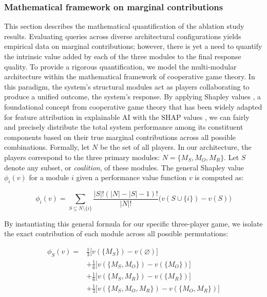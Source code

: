 \documentclass[preprint,review,12pt,authoryear]{elsarticle}
\begin{document}
\subsubsection{Mathematical framework on marginal contributions}

This section describes the mathematical quantification of the ablation study results. Evaluating queries across diverse architectural configurations yields empirical data on marginal contributions; however, there is yet a need to quantify the intrinsic value added by each of the three modules to the final response quality. To provide a rigorous quantification, we model the multi-modular architecture within the mathematical framework of cooperative game theory. In this paradigm, the system's structural modules act as players collaborating to produce a unified outcome, the system's response. By applying Shapley values \citep{shapley1953value}, a foundational concept from cooperative game theory that has been widely adapted for feature attribution in explainable AI with the SHAP values \citep{lundberg_unified_2017}, we can fairly and precisely distribute the total system performance among its constituent components based on their true marginal contributions across all possible combinations. Formally, let $N$ be the set of all players. In our architecture, the players correspond to the three primary modules: $N = \{M_{S}, M_{O}, M_{R}\}$. Let $S$ denote any subset, or \textit{coalition}, of these modules. The general Shapley value $\phi_i(v)$ for a module $i$ given a performance value function $v$ is computed as:

\begin{equation}
	\phi_i(v) = \sum_{S \subseteq N \setminus \{i\}} \frac{|S|!(|N| - |S| - 1)!}{|N|!} \big(v(S \cup \{i\}) - v(S)\big)
\end{equation}

By instantiating this general formula for our specific three-player game, we isolate the exact contribution of each module across all possible permutations:

\begin{equation}
    \begin{split}
        \phi_S(v) = {} & \frac{1}{3} \big[ v(\{M_S\}) - v(\varnothing) \big]              \\
                    & + \frac{1}{6} \big[ v(\{M_S, M_O\}) - v(\{M_O\}) \big]           \\
                    & + \frac{1}{6} \big[ v(\{M_S, M_R\}) - v(\{M_R\}) \big]           \\
                    & + \frac{1}{3} \big[ v(\{M_S, M_O, M_R\}) - v(\{M_O, M_R\}) \big]
    \end{split}
\end{equation}
\end{document}
